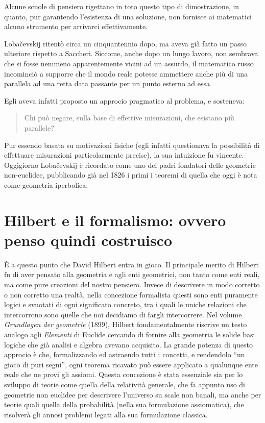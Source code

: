 \documentclass[a4paper,10pt]{article}
\begin{document}
Alcune scuole di pensiero rigettano in toto questo tipo di dimostrazione, in quanto, pur garantendo l'esistenza di una soluzione, non fornisce ai matematici alcuno strumento per arrivarci effettivamente.

Lobačevskij ritentò circa un cinquantennio dopo, ma aveva già fatto un passo ulteriore rispetto a Saccheri. Siccome, anche dopo un lungo lavoro, non sembrava che si fosse nemmeno apparentemente vicini ad un assurdo, il matematico russo incominciò a supporre che il mondo reale potesse ammettere anche più di una parallela ad una retta data passante per un punto esterno ad essa.

Egli aveva infatti proposto un approcio pragmatico al problema, e sosteneva:
\begin{quote}
Chi può negare, sulla base di effettive misurazioni, che esistano più parallele?
\end{quote}
Pur essendo basata su motivazioni fisiche (egli infatti questionava la possibilità di effettuare misurazioni particolarmente precise), la sua intuizione fu vincente. Oggigiorno Lobačevskij è ricordato come uno dei padri fondatori delle geometrie non-euclidee, pubblicando già nel 1826 i primi i teoremi di quella che oggi è nota come geometria iperbolica. \nocite{wp-geometria-iperbolica}

\section{Hilbert e il formalismo: ovvero penso quindi costruisco}
È a questo punto che David Hilbert entra in gioco.
Il principale merito di Hilbert fu di aver pensato alla geometria e agli enti geometrici, non tanto come enti reali, ma come pure creazioni del nostro pensiero. Invece di descrivere in modo corretto o non corretto una realtà, nella concezione formalista questi sono enti puramente logici e svuotati di ogni significato concreto, tra i quali le uniche relazioni che intercorrono sono quelle che noi decidiamo di fargli intercorrere.
Nel volume \textit{Grundlagen der geometrie} \cite{grundlagen} (1899), Hilbert fondamentalmente riscrive un testo analogo agli \textit{Elementi} di Euclide cercando di fornire alla geometria le solide basi logiche che già analisi e algebra avevano acquisito.
La grande potenza di questo approcio è che, formalizzando ed astraendo tutti i concetti, e rendendolo “un gioco di puri segni”, ogni teorema ricavato può essere applicato a qualunque ente reale che ne provi gli assiomi. Questa concezione è stata essenziale sia per lo sviluppo di teorie come quella della relatività generale, che fa appunto uso di geometrie non euclidee per descrivere l'universo su scale non banali, ma anche per teorie quali quella della probabilità (nella sua formulazione assiomatica), che risolverà gli annosi problemi legati alla sua formulazione classica.
\end{document}
